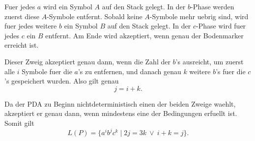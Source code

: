 \documentclass[a4paper,12pt,fleqn]{article}
\begin{document}
Fuer jedes $a$ wird ein Symbol $A$ auf den Stack gelegt. In der $b$-Phase werden zuerst diese
$A$-Symbole entfernt. Sobald keine $A$-Symbole mehr uebrig sind, wird fuer jedes weitere $b$ ein
Symbol $B$ auf den Stack gelegt. In der $c$-Phase wird fuer jedes $c$ ein $B$ entfernt. Am Ende wird
akzeptiert, wenn genau der Bodenmarker erreicht ist.

\begin{center}
\end{center}

Dieser Zweig akzeptiert genau dann, wenn die Zahl der $b$'s ausreicht, um zuerst alle $i$ Symbole fuer
die $a$'s zu entfernen, und danach genau $k$ weitere $b$'s fuer die $c$'s gespeichert wurden. Also gilt
genau
\[
    j=i+k.
\]

Da der PDA zu Beginn nichtdeterministisch einen der beiden Zweige waehlt, akzeptiert er genau dann,
wenn mindestens eine der Bedingungen erfuellt ist. Somit gilt
\[
\boxed{L(P)=\{a^ib^jc^k\mid 2j=3k \ \lor\ i+k=j\}.}
\]
\end{document}
